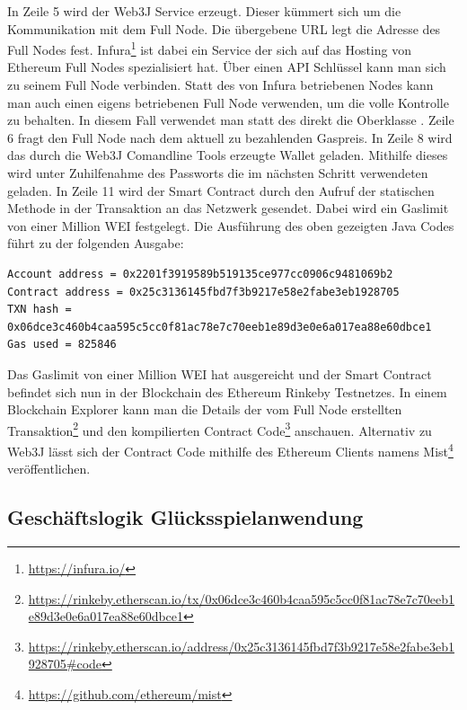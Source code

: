 

In Zeile 5 wird der Web3J Service erzeugt. Dieser kümmert sich um die Kommunikation mit dem Full Node. Die übergebene URL legt die Adresse des Full Nodes fest. Infura\footnote{\url{https://infura.io/}} ist dabei ein Service der sich auf das Hosting von Ethereum Full Nodes spezialisiert hat. Über einen API Schlüssel kann man sich zu seinem Full Node verbinden. Statt des von Infura betriebenen Nodes kann man auch einen eigens betriebenen Full Node verwenden, um die volle Kontrolle zu behalten. In diesem Fall verwendet man statt des  direkt die Oberklasse .
Zeile 6 fragt den Full Node nach dem aktuell zu bezahlenden Gaspreis.
In Zeile 8 wird das durch die Web3J Comandline Tools erzeugte Wallet geladen. Mithilfe dieses wird unter Zuhilfenahme des Passworts die im nächsten Schritt verwendeten  geladen.
In Zeile 11 wird der Smart Contract durch den Aufruf der statischen  Methode in der Transaktion an das Netzwerk gesendet. Dabei wird ein Gaslimit von einer Million WEI festgelegt.
Die Ausführung des oben gezeigten Java Codes führt zu der folgenden Ausgabe:

\begin{lstlisting}[basicstyle=\small]
Account address = 0x2201f3919589b519135ce977cc0906c9481069b2
Contract address = 0x25c3136145fbd7f3b9217e58e2fabe3eb1928705
TXN hash = 0x06dce3c460b4caa595c5cc0f81ac78e7c70eeb1e89d3e0e6a017ea88e60dbce1
Gas used = 825846
\end{lstlisting}

Das Gaslimit von einer Million WEI hat ausgereicht und der Smart Contract befindet sich nun in der Blockchain des Ethereum Rinkeby Testnetzes. In einem Blockchain Explorer kann man die Details der vom Full Node erstellten Transaktion\footnote{\url{https://rinkeby.etherscan.io/tx/0x06dce3c460b4caa595c5cc0f81ac78e7c70eeb1e89d3e0e6a017ea88e60dbce1}} und den kompilierten Contract Code\footnote{\url{https://rinkeby.etherscan.io/address/0x25c3136145fbd7f3b9217e58e2fabe3eb1928705\#code}} anschauen.
\if Alternativ zu Web3J lässt sich der Contract Code mithilfe des Ethereum Clients namens Mist\footnote{\url{https://github.com/ethereum/mist}} veröffentlichen.
\fi

\subsection{Geschäftslogik Glücksspielanwendung}

